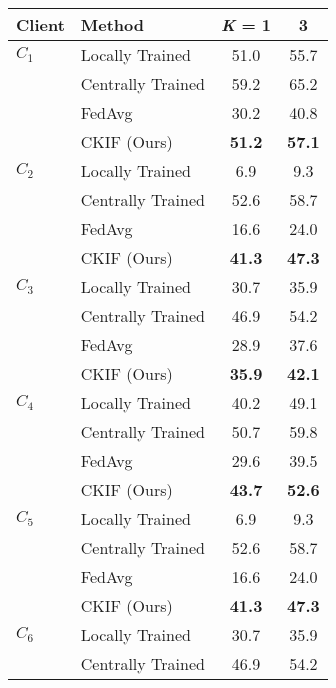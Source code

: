 \begin{table}[t]
    
    \setlength{\tabcolsep}{5pt}
    \centering
    \begin{subtable}{0.49\linewidth}{
    \begin{tabular}{llcc}
        \toprule
        Client       & Method                     & \textit{K} = 1 & 3    \\ \midrule
        $C_1$ & Locally Trained   & 51.0 & 55.7 \\
                       & Centrally Trained & 59.2 & 65.2 \\
                       & FedAvg   & 30.2 & 40.8 \\
                       & CKIF (Ours)     & \textbf{51.2} & \textbf{57.1} \\
        \midrule
        $C_2$ & Locally Trained   & 6.9 & 9.3 \\
                       & Centrally Trained & 52.6 & 58.7 \\
                       & FedAvg   & 16.6 & 24.0 \\
                       & CKIF (Ours)     & \textbf{41.3} & \textbf{47.3} \\
        \midrule
        $C_3$ & Locally Trained   & 30.7 & 35.9 \\
                       & Centrally Trained & 46.9 & 54.2 \\
                       & FedAvg   & 28.9 & 37.6 \\
                       & CKIF (Ours)     & \textbf{35.9} & \textbf{42.1} \\
        \midrule
        $C_4$ & Locally Trained   & 40.2 & 49.1 \\
                       & Centrally Trained & 50.7 & 59.8 \\
                       & FedAvg   & 29.6 & 39.5 \\
                       & CKIF (Ours)     & \textbf{43.7} & \textbf{52.6} \\
        \midrule
        $C_5$ & Locally Trained   & 6.9 & 9.3 \\
                       & Centrally Trained & 52.6 & 58.7 \\
                       & FedAvg   & 16.6 & 24.0 \\
                       & CKIF (Ours)     & \textbf{41.3} & \textbf{47.3} \\
        \midrule
        $C_6$ & Locally Trained   & 30.7 & 35.9 \\
                       & Centrally Trained & 46.9 & 54.2 \\

\end{tabular}}
\end{subtable}
\end{table}
